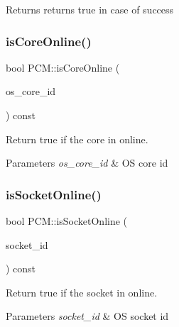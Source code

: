 \begin{DoxyReturn}{Returns}
returns true in case of success 
\end{DoxyReturn}
\mbox{\label{class_p_c_m_aabb7e0514fd741966fec461ccd9427f3}} 
\subsubsection{\texorpdfstring{is\+Core\+Online()}{isCoreOnline()}}
{\footnotesize\ttfamily bool P\+C\+M\+::is\+Core\+Online (\begin{DoxyParamCaption}\item[{int32}]{os\+\_\+core\+\_\+id }\end{DoxyParamCaption}) const}



Return true if the core in online. 


\begin{DoxyParams}{Parameters}
{\em os\+\_\+core\+\_\+id} & OS core id \\
\hline
\end{DoxyParams}
\mbox{\label{class_p_c_m_a67f21fcae47cfb6153055bf922c8a981}} 
\subsubsection{\texorpdfstring{is\+Socket\+Online()}{isSocketOnline()}}
{\footnotesize\ttfamily bool P\+C\+M\+::is\+Socket\+Online (\begin{DoxyParamCaption}\item[{int32}]{socket\+\_\+id }\end{DoxyParamCaption}) const}



Return true if the socket in online. 


\begin{DoxyParams}{Parameters}
{\em socket\+\_\+id} & OS socket id \\
\hline
\end{DoxyParams}
\mbox{\label{class_p_c_m_aab16be3893549f5f2d782071aeaead5f}} 
